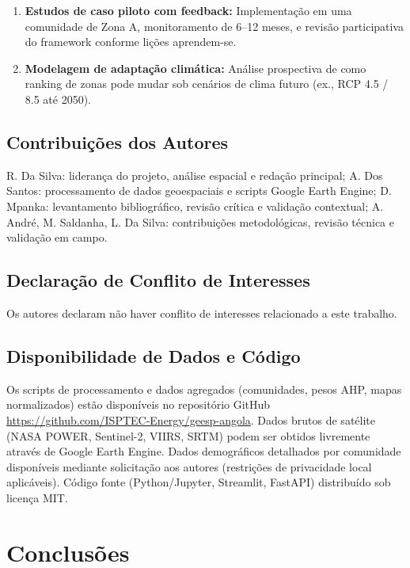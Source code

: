 \documentclass[12pt, a4paper]{article}
\begin{document}
\begin{itemize}
\begin{enumerate}
\item \textbf{Estudos de caso piloto com feedback:} Implementação em uma comunidade de Zona A, monitoramento de 6--12 meses, e revisão participativa do framework conforme lições aprendem-se.

\item \textbf{Modelagem de adaptação climática:} Análise prospectiva de como ranking de zonas pode mudar sob cenários de clima futuro (ex., RCP 4.5 / 8.5 até 2050).

\end{enumerate}


\subsection*{Contribuições dos Autores}
\label{sec:author-contributions}
R. Da Silva: liderança do projeto, análise espacial e redação principal; A. Dos Santos: processamento de dados geoespaciais e scripts Google Earth Engine; D. Mpanka: levantamento bibliográfico, revisão crítica e validação contextual; A. André, M. Saldanha, L. Da Silva: contribuições metodológicas, revisão técnica e validação em campo.

\subsection*{Declaração de Conflito de Interesses}
\label{sec:conflicts}
Os autores declaram não haver conflito de interesses relacionado a este trabalho.

\subsection*{Disponibilidade de Dados e Código}
\label{sec:data-availability}
Os scripts de processamento e dados agregados (comunidades, pesos AHP, mapas normalizados) estão disponíveis no repositório GitHub \url{https://github.com/ISPTEC-Energy/geesp-angola}. Dados brutos de satélite (NASA POWER, Sentinel-2, VIIRS, SRTM) podem ser obtidos livremente através de Google Earth Engine. Dados demográficos detalhados por comunidade disponíveis mediante solicitação aos autores (restrições de privacidade local aplicáveis). Código fonte (Python/Jupyter, Streamlit, FastAPI) distribuído sob licença MIT.

\section{Conclusões}


\end{itemize}
\end{document}
